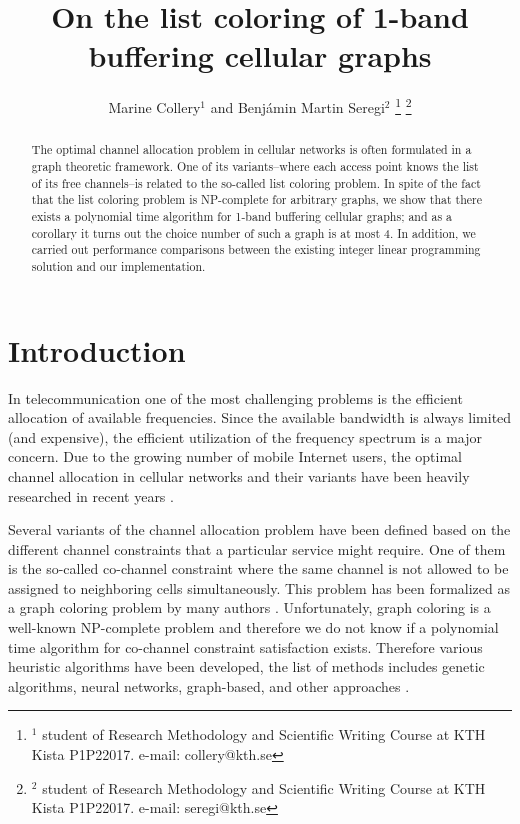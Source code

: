 \documentclass[letterpaper, 10 pt, conference]{ieeeconf}  %
\title{\LARGE \bf
On the list coloring of 1-band buffering cellular graphs
}
\author{Marine Collery$^{1}$ and Benjámin Martin Seregi$^{2}$%
\thanks{$^{1}$ student of Research Methodology and Scientific Writing Course at KTH Kista P1P22017. e-mail: collery@kth.se}%
\thanks{$^{2}$ student of Research Methodology and Scientific Writing Course at KTH Kista P1P22017. e-mail: seregi@kth.se}%
}
\begin{document}
\maketitle
\thispagestyle{fancy}
\fancyhf{}

\begin{abstract}
The optimal channel allocation problem in cellular networks is often formulated in a graph theoretic framework. One of its variants\---where each access point knows the list of its free channels\---is related to the so-called list coloring problem. In spite of the fact that the list coloring problem is NP-complete for arbitrary graphs, we show that there exists a polynomial time algorithm for 1-band buffering cellular graphs; and as a corollary it turns out the choice number of such a graph is at most 4. In addition, we carried out performance comparisons between the existing integer linear programming solution and our implementation.
\end{abstract}

\section{Introduction}

In telecommunication one of the most challenging problems is the efficient allocation of available frequencies. Since the available bandwidth is always limited (and expensive), the efficient utilization of the frequency spectrum is a major concern. Due to the growing number of mobile Internet users, the optimal channel allocation in cellular networks and their variants have been heavily researched in recent years \cite{Audhya:2011:SCA:1988563.1988571}.

Several variants of the channel allocation problem have been defined based on the different channel constraints that a particular service might require. One of them is the so-called co-channel constraint where the same channel is not allowed to be assigned to neighboring cells simultaneously. This problem has been formalized as a graph coloring problem by many authors \cite{1456167}. Unfortunately, graph coloring is a well-known NP-complete problem \cite{Kar72} and therefore we do not know if a polynomial time algorithm for co-channel constraint satisfaction exists. Therefore various heuristic algorithms have been developed, the list of methods includes genetic algorithms, neural networks, graph-based, and other approaches \cite{Audhya:2011:SCA:1988563.1988571}.
\end{document}
